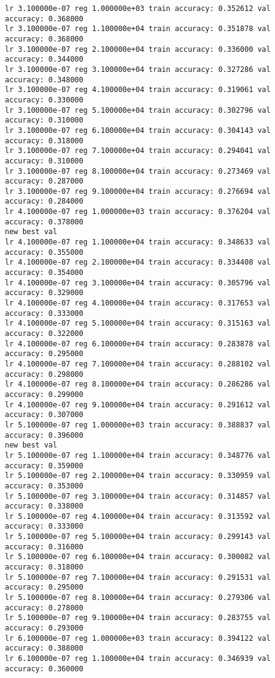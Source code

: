 \documentclass[11pt]{article}
\begin{document}
\begin{Verbatim}[commandchars=\\\{\}]
lr 3.100000e-07 reg 1.000000e+03 train accuracy: 0.352612 val accuracy: 0.368000
lr 3.100000e-07 reg 1.100000e+04 train accuracy: 0.351878 val accuracy: 0.368000
lr 3.100000e-07 reg 2.100000e+04 train accuracy: 0.336000 val accuracy: 0.344000
lr 3.100000e-07 reg 3.100000e+04 train accuracy: 0.327286 val accuracy: 0.348000
lr 3.100000e-07 reg 4.100000e+04 train accuracy: 0.319061 val accuracy: 0.330000
lr 3.100000e-07 reg 5.100000e+04 train accuracy: 0.302796 val accuracy: 0.310000
lr 3.100000e-07 reg 6.100000e+04 train accuracy: 0.304143 val accuracy: 0.318000
lr 3.100000e-07 reg 7.100000e+04 train accuracy: 0.294041 val accuracy: 0.310000
lr 3.100000e-07 reg 8.100000e+04 train accuracy: 0.273469 val accuracy: 0.287000
lr 3.100000e-07 reg 9.100000e+04 train accuracy: 0.276694 val accuracy: 0.284000
lr 4.100000e-07 reg 1.000000e+03 train accuracy: 0.376204 val accuracy: 0.378000
new best val
lr 4.100000e-07 reg 1.100000e+04 train accuracy: 0.348633 val accuracy: 0.355000
lr 4.100000e-07 reg 2.100000e+04 train accuracy: 0.334408 val accuracy: 0.354000
lr 4.100000e-07 reg 3.100000e+04 train accuracy: 0.305796 val accuracy: 0.329000
lr 4.100000e-07 reg 4.100000e+04 train accuracy: 0.317653 val accuracy: 0.333000
lr 4.100000e-07 reg 5.100000e+04 train accuracy: 0.315163 val accuracy: 0.322000
lr 4.100000e-07 reg 6.100000e+04 train accuracy: 0.283878 val accuracy: 0.295000
lr 4.100000e-07 reg 7.100000e+04 train accuracy: 0.288102 val accuracy: 0.298000
lr 4.100000e-07 reg 8.100000e+04 train accuracy: 0.286286 val accuracy: 0.299000
lr 4.100000e-07 reg 9.100000e+04 train accuracy: 0.291612 val accuracy: 0.307000
lr 5.100000e-07 reg 1.000000e+03 train accuracy: 0.388837 val accuracy: 0.396000
new best val
lr 5.100000e-07 reg 1.100000e+04 train accuracy: 0.348776 val accuracy: 0.359000
lr 5.100000e-07 reg 2.100000e+04 train accuracy: 0.330959 val accuracy: 0.353000
lr 5.100000e-07 reg 3.100000e+04 train accuracy: 0.314857 val accuracy: 0.338000
lr 5.100000e-07 reg 4.100000e+04 train accuracy: 0.313592 val accuracy: 0.333000
lr 5.100000e-07 reg 5.100000e+04 train accuracy: 0.299143 val accuracy: 0.316000
lr 5.100000e-07 reg 6.100000e+04 train accuracy: 0.300082 val accuracy: 0.318000
lr 5.100000e-07 reg 7.100000e+04 train accuracy: 0.291531 val accuracy: 0.295000
lr 5.100000e-07 reg 8.100000e+04 train accuracy: 0.279306 val accuracy: 0.278000
lr 5.100000e-07 reg 9.100000e+04 train accuracy: 0.283755 val accuracy: 0.293000
lr 6.100000e-07 reg 1.000000e+03 train accuracy: 0.394122 val accuracy: 0.388000
lr 6.100000e-07 reg 1.100000e+04 train accuracy: 0.346939 val accuracy: 0.360000

\end{Verbatim}
\end{document}

